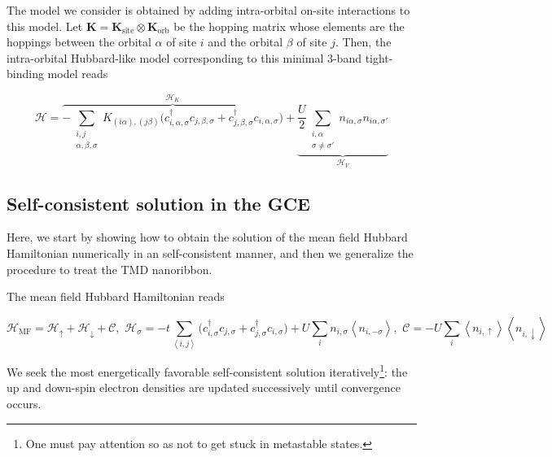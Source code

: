 The model we consider is obtained by adding intra-orbital on-site interactions to this model.
Let $\bm K = \bm K_{\text{site}} \otimes \bm K_{\text{orb}}$ be the hopping matrix whose elements are the hoppings between the orbital $\alpha$ of site $i$ and the orbital $\beta$ of site $j$.
Then, the intra-orbital Hubbard-like model corresponding to this minimal 3-band tight-binding model reads
\begin{strip}
\begin{equation}\label{eq:tmdHam}
\mathcal{H} = \overbrace{- \sum_{\substack{i, j \\ \alpha, \beta, \sigma}} K_{(i\alpha),(j\beta )} \bigg( c_{i,\alpha, \sigma}^\dagger c_{j,\beta, \sigma} + c_{j,\beta , \sigma}^\dagger c_{i,\alpha, \sigma} \bigg)}^{\mathcal{H}_K} + \underbrace{\frac{U}{2} \sum_{\substack{i, \alpha \\ \sigma \neq \sigma'} } n_{i\alpha, \sigma} n_{i\alpha, \sigma'}}_{\mathcal{H}_V}
\end{equation}
\end{strip}

\subsection{Self-consistent solution in the GCE}\label{subsec:selfconsistent}

Here, we start by showing how to obtain the solution of the mean field Hubbard Hamiltonian numerically in an self-consistent manner, and then we generalize the procedure to treat the TMD nanoribbon.

The mean field Hubbard Hamiltonian reads
\begin{strip}
\begin{equation}
\mathcal{H}_{\text{MF}} = \mathcal{H}_\uparrow + \mathcal{H}_\downarrow + \mathcal{C} , \,\, \mathcal{H}_\sigma = - t \sum_{\left\langle i, j \right\rangle} \bigg( c_{i,\sigma}^\dagger c_{j,\sigma} + c_{j,\sigma}^\dagger c_{i,\sigma} \bigg) + U \sum_i n_{i,\sigma} \left\langle n_{i,-\sigma} \right\rangle , \,\, \mathcal{C} = - U \sum_i \left\langle n_{i,\uparrow} \right\rangle \left\langle n_{i,\downarrow} \right\rangle
\end{equation}
\end{strip}

We seek the most energetically favorable self-consistent solution iteratively\footnote{One must pay attention so as not to get stuck in metastable states.}: the up and down-spin electron densities are updated successively until convergence occurs.

